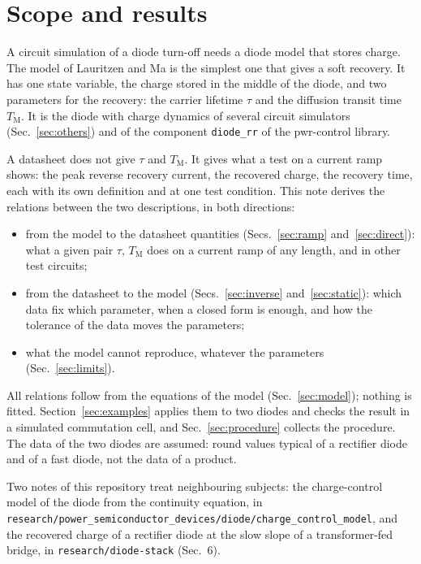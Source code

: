 \documentclass[10pt,a4paper]{scrartcl}
\newcommand{\TM}{T_\mathrm{M}}
\begin{document}

\tableofcontents
\newpage

\section{Scope and results}
\label{sec:scope}
A circuit simulation of a diode turn-off needs a diode model that stores charge. The model of Lauritzen and Ma \cite{lauritzen1991} is the simplest one that gives a soft recovery. It has one state variable, the charge stored in the middle of the diode, and two parameters for the recovery: the carrier lifetime $\tau$ and the diffusion transit time $\TM$. It is the diode with charge dynamics of several circuit simulators (Sec.~\ref{sec:others}) and of the component \texttt{diode\_rr} of the pwr-control library.

A datasheet does not give $\tau$ and $\TM$. It gives what a test on a current ramp shows: the peak reverse recovery current, the recovered charge, the recovery time, each with its own definition and at one test condition. This note derives the relations between the two descriptions, in both directions:
\begin{itemize}
\item from the model to the datasheet quantities (Secs.~\ref{sec:ramp} and~\ref{sec:direct}): what a given pair $\tau$, $\TM$ does on a current ramp of any length, and in other test circuits;
\item from the datasheet to the model (Secs.~\ref{sec:inverse} and~\ref{sec:static}): which data fix which parameter, when a closed form is enough, and how the tolerance of the data moves the parameters;
\item what the model cannot reproduce, whatever the parameters (Sec.~\ref{sec:limits}).
\end{itemize}
All relations follow from the equations of the model (Sec.~\ref{sec:model}); nothing is fitted. Section~\ref{sec:examples} applies them to two diodes and checks the result in a simulated commutation cell, and Sec.~\ref{sec:procedure} collects the procedure. The data of the two diodes are assumed: round values typical of a rectifier diode and of a fast diode, not the data of a product.

Two notes of this repository treat neighbouring subjects: the charge-control model of the diode from the continuity equation, in \texttt{research/power\_semiconductor\_devices/diode/charge\_control\_model}, and the recovered charge of a rectifier diode at the slow slope of a transformer-fed bridge, in \texttt{research/diode-stack} (Sec.~6).
\end{document}
